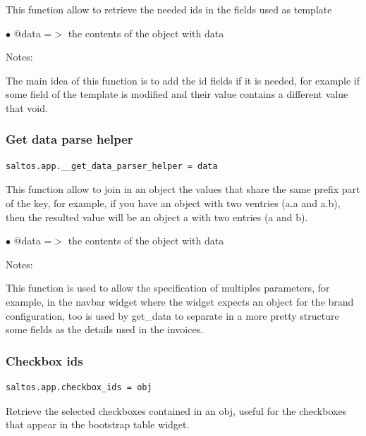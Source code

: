 \documentclass[a4paper]{article}
\begin{document}
This function allow to retrieve the needed ids in the fields used as template

\begin{compactitem}
\item[\color{myblue}$\bullet$] @data =$>$ the contents of the object with data
\end{compactitem}

Notes:

The main idea of this function is to add the id fields if it is needed, for example
if some field of the template is modified and their value contains a different value
that void.

\hypertarget{toc15}{}
\subsubsection{Get data parse helper}

\begin{lstlisting}
saltos.app.__get_data_parser_helper = data
\end{lstlisting}

This function allow to join in an object the values that share the same prefix part of
the key, for example, if you have an object with two ventries (a.a and a.b), then the
resulted value will be an object a with two entries (a and b).

\begin{compactitem}
\item[\color{myblue}$\bullet$] @data =$>$ the contents of the object with data
\end{compactitem}

Notes:

This function is used to allow the specification of multiples parameters, for example,
in the navbar widget where the widget expects an object for the brand configuration, too
is used by get\_data to separate in a more pretty structure some fields as the details used
in the invoices.

\hypertarget{toc16}{}
\subsubsection{Checkbox ids}

\begin{lstlisting}
saltos.app.checkbox_ids = obj
\end{lstlisting}

Retrieve the selected checkboxes contained in an obj, useful for the checkboxes
that appear in the bootstrap table widget.
\end{document}

